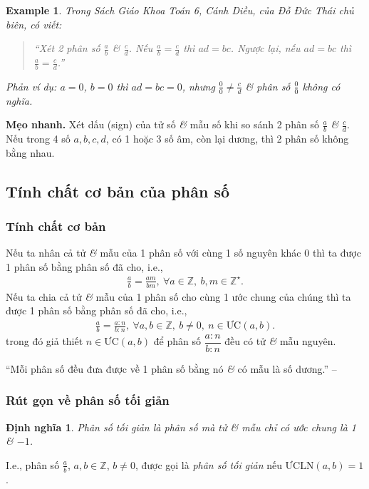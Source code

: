 \documentclass[oneside]{book}
\numberwithin{equation}{section}
\newtheorem{dinhnghia}{Định nghĩa}[section]
\newtheorem{example}{Example}[section]
\begin{document}
\begin{example}
	Trong Sách Giáo Khoa Toán 6, Cánh Diều, của Đỗ Đức Thái chủ biên, có viết:
	\begin{quotation}
		``Xét 2 phân số $\frac{a}{b}$ \textit{\&} $\frac{c}{d}$. Nếu $\frac{a}{b} = \frac{c}{d}$ thì $ad = bc$. Ngược lại, nếu $ad = bc$ thì $\frac{a}{b} = \frac{c}{d}$.''
	\end{quotation}
	Phản ví dụ: $a = 0$, $b = 0$ thì $ad = bc = 0$, nhưng $\frac{0}{0}\ne\frac{c}{d}$ \textit{\&} phân số $\frac{0}{0}$ không có nghĩa.
\end{example}
\textbf{Mẹo nhanh.} Xét dấu (sign) của tử số \textit{\&} mẫu số khi so sánh 2 phân số $\frac{a}{b}$ \textit{\&} $\frac{c}{d}$. Nếu trong 4 số $a,b,c,d$, có 1 hoặc 3 số âm, còn lại dương, thì 2 phân số không bằng nhau.

\subsection{Tính chất cơ bản của phân số}

\subsubsection{Tính chất cơ bản}
Nếu ta nhân cả tử \textit{\&} mẫu của 1 phân số với cùng 1 số nguyên khác 0 thì ta được 1 phân số bằng phân số đã cho, i.e.,
\begin{align*}
	\frac{a}{b} = \frac{am}{bm},\ \forall a\in\mathbb{Z},\ b,m\in\mathbb{Z}^\star.
\end{align*}
Nếu ta chia cả tử \textit{\&} mẫu của 1 phân số cho cùng 1 ước chung của chúng thì ta được 1 phân số bằng phân số đã cho, i.e.,
\begin{align*}
	\frac{a}{b} = \frac{a:n}{b:n},\ \forall a,b\in\mathbb{Z},\ b\ne 0,\ n\in\mbox{ƯC}(a,b).
\end{align*}
trong đó giả thiết $n\in\mbox{ƯC}(a,b)$ để phân số $\dfrac{a:n}{b:n}$ đều có tử \textit{\&} mẫu nguyên.

``Mỗi phân số đều đưa được về 1 phân số bằng nó \textit{\&} có mẫu là số dương.'' -- \cite[p. 28]{Thai_Anh_Dat_Ha_Loan_Nam_Quang_Toan_6_tap_2}

\subsubsection{Rút gọn về phân số tối giản}
\begin{dinhnghia}
	\emph{Phân số tối giản} là phân số mà tử \textit{\&} mẫu chỉ có ước chung là 1 \textit{\&} $-1$.
\end{dinhnghia}
I.e., phân số $\frac{a}{b}$, $a,b\in\mathbb{Z}$, $b\ne 0$, được gọi là \emph{phân số tối giản} nếu $\mbox{ƯCLN}(a,b) = 1$.
\end{document}

